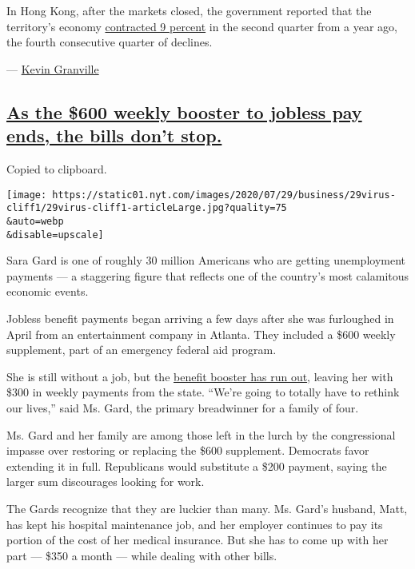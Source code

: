 In Hong Kong, after the markets closed, the government reported that the
territory's economy
\href{https://www.nytimes.com/live/2020/07/29/business/stock-market-today-coronavirus/hong-kongs-economy-shrank-by-9-percent-in-the-second-quarter}{contracted
9 percent} in the second quarter from a year ago, the fourth consecutive
quarter of declines.

--- \href{https://www.nytimes.com/by/kevin-granville}{Kevin Granville}

\hypertarget{as-the-600-weekly-booster-to-jobless-pay-ends-the-bills-dont-stop}{%
\subsection{\texorpdfstring{\protect\hyperlink{as-the-600-weekly-booster-to-jobless-pay-ends-the-bills-dont-stop}{As
the \$600 weekly booster to jobless pay ends, the bills don't
stop.}}{As the \$600 weekly booster to jobless pay ends, the bills don't stop.}}\label{as-the-600-weekly-booster-to-jobless-pay-ends-the-bills-dont-stop}}

Copied to clipboard.

\texttt{[image: https://static01.nyt.com/images/2020/07/29/business/29virus-cliff1/29virus-cliff1-articleLarge.jpg?quality=75\\\&auto=webp\\\&disable=upscale]}

Sara Gard is one of roughly 30 million Americans who are getting
unemployment payments --- a staggering figure that reflects one of the
country's most calamitous economic events.

Jobless benefit payments began arriving a few days after she was
furloughed in April from an entertainment company in Atlanta. They
included a \$600 weekly supplement, part of an emergency federal aid
program.

She is still without a job, but the
\href{https://www.nytimes.com/2020/07/21/business/economy/coronavirus-unemployment-benefits.html}{benefit
booster has run out}, leaving her with \$300 in weekly payments from the
state. ``We're going to totally have to rethink our lives,'' said Ms.
Gard, the primary breadwinner for a family of four.

Ms. Gard and her family are among those left in the lurch by the
congressional impasse over restoring or replacing the \$600 supplement.
Democrats favor extending it in full. Republicans would substitute a
\$200 payment, saying the larger sum discourages looking for work.

The Gards recognize that they are luckier than many. Ms. Gard's husband,
Matt, has kept his hospital maintenance job, and her employer continues
to pay its portion of the cost of her medical insurance. But she has to
come up with her part --- \$350 a month --- while dealing with other
bills.

